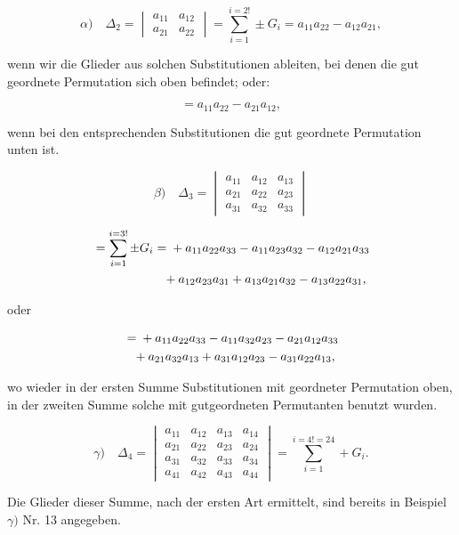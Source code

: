 \documentclass[11pt]{article}
\providecommand{\weberpage}[1]{}
\let\Delta\varDelta
\begin{document}
\[
\alpha)\quad \Delta_2 = \begin{vmatrix} a_{11} & a_{12} \\ a_{21} & a_{22} \end{vmatrix} = \sum_{i=1}^{i=2!} \pm G_i = a_{11}a_{22} - a_{12}a_{21},
\]

wenn wir die Glieder aus solchen Substitutionen ableiten, bei denen die gut geordnete Permutation sich oben befindet; oder:


\weberpage{20}
\[
= a_{11}a_{22} - a_{21}a_{12},
\]

wenn bei den entsprechenden Substitutionen die gut geordnete Permutation unten ist.

\[
\beta)\quad \Delta_3 = \begin{vmatrix} a_{11} & a_{12} & a_{13} \\ a_{21} & a_{22} & a_{23} \\ a_{31} & a_{32} & a_{33} \end{vmatrix}
\]

\[
\begin{aligned}
&= \sum_{i=1}^{i=3!} \pm G_i = {}+a_{11}a_{22}a_{33} - a_{11}a_{23}a_{32} - a_{12}a_{21}a_{33}\\
&\hphantom{= \sum_{i=1}^{i=3!} \pm G_i =} {}+a_{12}a_{23}a_{31} + a_{13}a_{21}a_{32} - a_{13}a_{22}a_{31},
\end{aligned}
\]

oder

\[
\begin{aligned}
&= {}+a_{11}a_{22}a_{33} - a_{11}a_{32}a_{23} - a_{21}a_{12}a_{33}\\
&\hphantom{=} {}+a_{21}a_{32}a_{13} + a_{31}a_{12}a_{23} - a_{31}a_{22}a_{13},
\end{aligned}
\]

wo wieder in der ersten Summe Substitutionen mit geordneter Permutation oben, in der zweiten Summe solche mit gutgeordneten Permutanten benutzt wurden. %

\[
\gamma)\quad \Delta_4 = \begin{vmatrix} a_{11} & a_{12} & a_{13} & a_{14} \\ a_{21} & a_{22} & a_{23} & a_{24} \\ a_{31} & a_{32} & a_{33} & a_{34} \\ a_{41} & a_{42} & a_{43} & a_{44} \end{vmatrix} = \sum_{i=1}^{i=4!=24} + G_i.
\]

Die Glieder dieser Summe, nach der ersten Art ermittelt, sind bereits in Beispiel $\gamma)$ Nr. 13 angegeben.
\end{document}
